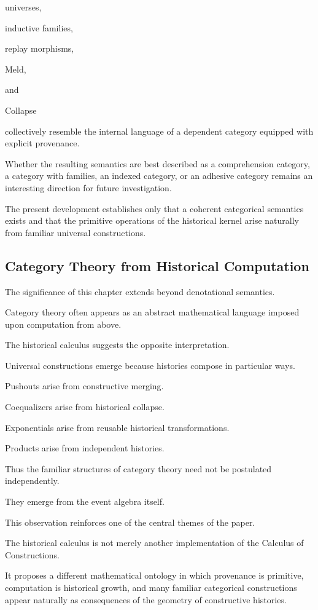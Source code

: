 \documentclass[12pt,oneside]{article}
\theoremstyle{definition}
\theoremstyle{remark}
\begin{document}
universes,

inductive families,

replay morphisms,

Meld,

and

Collapse

collectively resemble the internal language of a dependent category equipped
with explicit provenance.

Whether the resulting semantics are best described as a comprehension category,
a category with families, an indexed category, or an adhesive category remains
an interesting direction for future investigation.

The present development establishes only that a coherent categorical semantics
exists and that the primitive operations of the historical kernel arise
naturally from familiar universal constructions.

\subsection{Category Theory from Historical Computation}

The significance of this chapter extends beyond denotational semantics.

Category theory often appears as an abstract mathematical language imposed upon
computation from above.

The historical calculus suggests the opposite interpretation.

Universal constructions emerge because histories compose in particular ways.

Pushouts arise from constructive merging.

Coequalizers arise from historical collapse.

Exponentials arise from reusable historical transformations.

Products arise from independent histories.

Thus the familiar structures of category theory need not be postulated
independently.

They emerge from the event algebra itself.

This observation reinforces one of the central themes of the paper.

The historical calculus is not merely another implementation of the Calculus of
Constructions.

It proposes a different mathematical ontology in which provenance is primitive,
computation is historical growth, and many familiar categorical constructions
appear naturally as consequences of the geometry of constructive histories.
\end{document}
